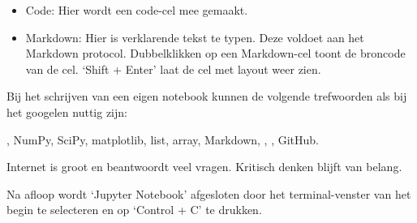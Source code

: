 \begin{itemize}
\item Code: Hier wordt een code-cel mee gemaakt.
\item Markdown: Hier is verklarende tekst te typen. Deze voldoet aan het Markdown protocol. Dubbelklikken op een Markdown-cel
toont de broncode van de cel. `Shift + Enter' laat de cel met layout weer zien.
\end{itemize}

Bij het schrijven van een eigen notebook kunnen de volgende trefwoorden als bij het googelen nuttig zijn:

\python, NumPy, SciPy, matplotlib, list, array, Markdown, \hisparc, \sapphire, GitHub.

Internet is groot en beantwoordt veel vragen. Kritisch denken blijft van belang.

Na afloop wordt `Jupyter Notebook' afgesloten door
het terminal-venster van het begin te selecteren en op `Control + C' te drukken.


